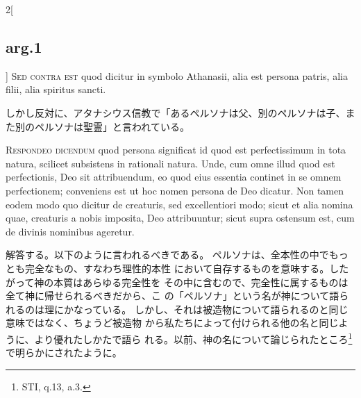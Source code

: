 \documentclass[paper=a4paper,fontsize=10pt,jafontsize=9pt,titlepage]{jlreq}
\begin{document}
\begin{paracol}{2}[\subsection{arg.1}]
{\scshape Sed contra est} quod dicitur in symbolo Athanasii, alia est persona
patris, alia filii, alia spiritus sancti.

\switchcolumn

しかし反対に、アタナシウス信教で「あるペルソナは父、別のペルソナは子、ま
 た別のペルソナは聖霊」と言われている。


{\scshape Respondeo dicendum} quod persona significat id quod est
perfectissimum in tota natura, scilicet subsistens in rationali
natura. Unde, cum omne illud quod est perfectionis, Deo sit
attribuendum, eo quod eius essentia continet in se omnem perfectionem;
conveniens est ut hoc nomen persona de Deo dicatur. Non tamen eodem modo
quo dicitur de creaturis, sed excellentiori modo; sicut et alia nomina
quae, creaturis a nobis imposita, Deo attribuuntur; sicut supra ostensum
est, cum de divinis nominibus ageretur.

\switchcolumn

解答する。以下のように言われるべきである。
ペルソナは、全本性の中でもっとも完全なもの、すなわち理性的本性
 において自存するものを意味する。したがって神の本質はあらゆる完全性を
 その中に含むので、完全性に属するものは全て神に帰せられるべきだから、こ
 の「ペルソナ」という名が神について語られるのは理にかなっている。
しかし、それは被造物について語られるのと同じ意味ではなく、ちょうど被造物
 から私たちによって付けられる他の名と同じように、より優れたしかたで語ら
 れる。以前、神の名について論じられたところ\footnote{STI,
 q.13, a.3.}で明らかにされたように。


%
%
%
%

\switchcolumn*[\subsection{ad.1}]


\end{paracol}
\end{document}
